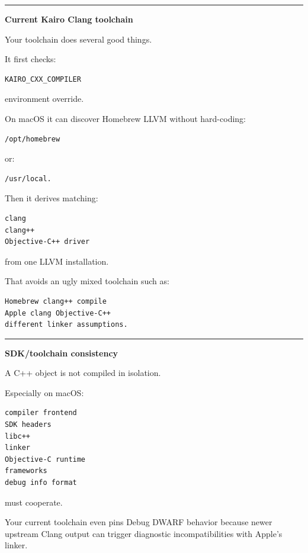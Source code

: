 \begin{center}\rule{0.5\linewidth}{0.5pt}\end{center}

\textbf{Current Kairo Clang toolchain}

Your toolchain does several good things.

It first checks:

\begin{verbatim}
KAIRO_CXX_COMPILER
\end{verbatim}

environment override.

On macOS it can discover Homebrew LLVM without hard-coding:

\begin{verbatim}
/opt/homebrew
\end{verbatim}

or:

\begin{verbatim}
/usr/local.
\end{verbatim}

Then it derives matching:

\begin{verbatim}
clang
clang++
Objective-C++ driver
\end{verbatim}

from one LLVM installation.

That avoids an ugly mixed toolchain such as:

\begin{verbatim}
Homebrew clang++ compile
Apple clang Objective-C++
different linker assumptions.
\end{verbatim}

\begin{center}\rule{0.5\linewidth}{0.5pt}\end{center}

\textbf{SDK/toolchain consistency}

A C++ object is not compiled in isolation.

Especially on macOS:

\begin{verbatim}
compiler frontend
SDK headers
libc++
linker
Objective-C runtime
frameworks
debug info format
\end{verbatim}

must cooperate.

Your current toolchain even pins Debug DWARF behavior because newer upstream Clang output can trigger diagnostic incompatibilities with Apple's linker.

